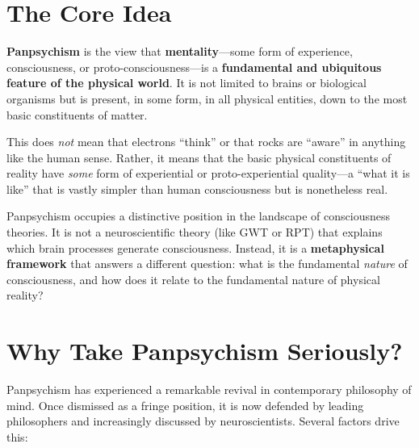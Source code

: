 \documentclass[11pt,a4paper]{report}
\begin{document}
\section{The Core Idea}

\begin{definitionbox}[Panpsychism]
\textbf{Panpsychism} is the view that \textbf{mentality}---some form of experience, consciousness, or proto-consciousness---is a \textbf{fundamental and ubiquitous feature of the physical world}. It is not limited to brains or biological organisms but is present, in some form, in all physical entities, down to the most basic constituents of matter.

This does \emph{not} mean that electrons ``think'' or that rocks are ``aware'' in anything like the human sense. Rather, it means that the basic physical constituents of reality have \emph{some} form of experiential or proto-experiential quality---a ``what it is like'' that is vastly simpler than human consciousness but is nonetheless real.
\end{definitionbox}

Panpsychism occupies a distinctive position in the landscape of consciousness theories. It is not a neuroscientific theory (like GWT or RPT) that explains which brain processes generate consciousness. Instead, it is a \textbf{metaphysical framework} that answers a different question: what is the fundamental \emph{nature} of consciousness, and how does it relate to the fundamental nature of physical reality?

\section{Why Take Panpsychism Seriously?}

Panpsychism has experienced a remarkable revival in contemporary philosophy of mind. Once dismissed as a fringe position, it is now defended by leading philosophers and increasingly discussed by neuroscientists. Several factors drive this:
\end{document}
